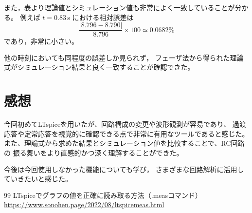 \documentclass{jarticle}
\begin{document}
また，表より理論値とシミュレーション値も非常によく一致していることが分かる。
例えば $t=0.83\,\mathrm{s}$ における相対誤差は
\[
\frac{|8.796-8.790|}{8.796}\times100
\simeq 0.0682\%
\]
であり，非常に小さい。

他の時刻においても同程度の誤差しか見られず，
フェーザ法から得られた理論式がシミュレーション結果と良く一致することが確認できた。

\section{感想}
今回初めてLTspiceを用いたが、回路構成の変更や波形観測が容易であり、
過渡応答や定常応答を視覚的に確認できる点で非常に有用なツールであると感じた。
また、理論式から求めた結果とシミュレーション値を比較することで、RC回路の
振る舞いをより直感的かつ深く理解することができた。

今後は今回使用しなかった機能についても学び，
さまざまな回路解析に活用していきたいと感じた。


















\begin{thebibliography}{99}
    LTspiceでグラフの値を正確に読み取る方法（.measコマンド）　\url{https://www.sonohen.page/2022/08/ltspicemeas.html}
\end{thebibliography}
\end{document}
